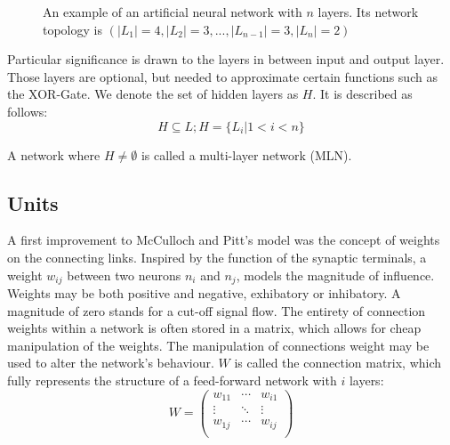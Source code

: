 \documentclass[10pt,a4paper,DIV=11]{scrreprt}
\let\oldemptyset\emptyset
\let\emptyset\varnothing
\begin{document}
\begin{figure}[H]
\caption{An example of an artificial neural network with $n$ layers. Its network topology is $(|L_1|=4,|L_2|=3,...,|L_{n-1}|=3,|L_n|=2)$}
\label{fig:layer}
\end{figure}

Particular significance is drawn to the layers in between input and output layer. Those layers are optional, but needed to approximate certain 
functions such as the XOR-Gate. 
We denote the set of hidden layers as $H$. It is described as follows:
\begin{equation}
H \subseteq L; H = \{L_i|1<i<n\}
\end{equation} 

A network where $H \neq \oldemptyset$ is called a multi-layer network (MLN). 

\subsection{Units}
\label{subsec:weights}

A first improvement to McCulloch and Pitt's model was the concept of weights on the connecting links. Inspired by the function of the synaptic 
terminals, a weight $w_{ij}$ between two neurons $n_i$ and $n_j$, models the magnitude of influence. Weights may be both positive and negative, 
exhibatory or inhibatory. A magnitude of zero stands for a cut-off signal flow. The entirety of connection weights within a network is often stored 
in a matrix, which allows for cheap manipulation of the weights. 
The manipulation of connections weight may be used to alter the network's behaviour. $W$ is called the connection matrix, which fully represents 
the structure of a feed-forward network with $i$ layers:
\begin{equation}
W = 
\begin{pmatrix}
w_{11} & \cdots & w_{i1} \\
\vdots & \ddots & \vdots \\
w_{1j} & \cdots & w_{ij} \\
\end{pmatrix}
\end{equation}
\end{document}
